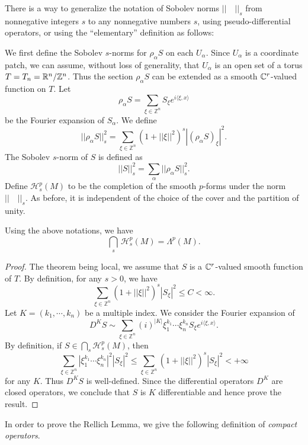 There is a way to generalize the notation of Sobolev norms
$||\quad||_s$
from nonnegative integers $s$ to
 any nonnegative numbers $s$, using pseudo-differential
operators, or using the ``elementary'' definition as follows:

We first define the Sobolev $s$-norms for $\rho_\alpha
S$ on each $U_\alpha$. Since $U_\alpha$ is a coordinate
patch, we can assume, without loss of  generality, that
$U_\alpha$ is an open set of a  torus $T=T_{n}=\mathbb R^{n}/\mathbb Z^{n}$.
Thus the section  $\rho_\alpha S$ can be extended as a
smooth $\mathbb C^r$-valued function on $T$. Let
\[
\rho_\alpha S=\sum_{\xi\in\mathbb Z^{n}}S_\xi e^{i\langle\xi,x\rangle}
\]
be the Fourier expansion of $S_\alpha$. We define
\[
||\rho_\alpha S||_s^2=\sum_{\xi\in\mathbb Z^{n}}(1+||\xi||^2)^s
|(\rho_\alpha S)_\xi|^2.
\]
The Sobolev $s$-norm of $S$ is defined as
\[
||S||_s^2=\sum_\alpha||\rho_\alpha S||_s^2.
\]
Define $\mathcal H_s^{p}(M)$ to be the completion of the
smooth
$p$-forms under the norm $||\quad||_s$.
As before, it is independent of the
choice of the cover and the partition of unity.

\begin{theorem}
Using the above notations, we have
\[
\underset{s}{\bigcap}\,\mathcal H^{p}_s(M)=\Lambda^{p}(M).
\]
\end{theorem}



\begin{proof} The theorem being local, we assume that $S$
is a $\mathbb C^r$-valued smooth function of $T$. By definition,
for any $s>0$, we have
\[
\sum_{\xi\in \mathbb Z^{n}} (1+||\xi||^2)^s |S_\xi|^2\leq C
<\infty.
\]
Let $K=(k_1,\cdots,k_{n})$ be a multiple index. We consider
the Fourier expansion of
\[
D^K S\sim \sum_{\xi\in \mathbb Z^{n}} (i)^{|K|}\xi_1^{k_1}\cdots\xi_{n}^{k_{n}}
S_\xi e^{i\langle\xi,x\rangle}.
\]
By definition, if $S\in\bigcap_s \mathcal H^{p}_s(M)$, then
\[
\sum_{\xi\in \mathbb Z^n} |\xi_1^{k_1}\cdots \xi_{n}^{k_{n}}|^2
 |S_\xi|^2\leq  \sum_{\xi\in \mathbb Z^{n}} (1+||\xi||^2)^s |S_\xi|^2<+\infty
\]
for any $K$.
Thus $D^K S$ is well-defined. Since the differential operators $D^K$ are closed operators, we conclude that $S$ is $K$ differentiable and hence prove the result.

\end{proof}

In order to prove the Rellich Lemma, we  give
the following definition of
{\it compact operators}.

